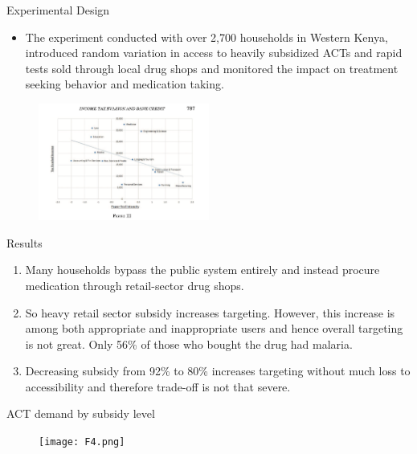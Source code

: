 \documentclass{beamer}
\begin{document}
\begin{frame}{Experimental Design}
\begin{itemize}

    \item The experiment  conducted with over 2,700 households in Western Kenya, introduced random variation in
    access to heavily subsidized ACTs and rapid tests sold through local drug shops and monitored the impact on treatment seeking behavior and medication taking.
    


\end{itemize}
\begin{figure}

\includegraphics[width=0.5\textwidth]{F2.png}
\end{figure}
    \end{frame}

\begin{frame}[allowframebreaks]{Results}  
\begin{enumerate}
\item Many households bypass the public system
entirely and instead procure medication through retail-sector drug shops.
\item So heavy retail sector subsidy increases targeting. However, this increase is among both appropriate and inappropriate users and hence overall targeting is not great. Only 56\% of those who bought the drug had malaria.
\item Decreasing subsidy from 92\% to 80\% increases targeting without much loss to accessibility and therefore trade-off is not that severe.

    \end{enumerate}
\end{frame}

\begin{frame}{ACT demand by subsidy level}
\begin{figure}
    \texttt{[image: F4.png]}
\end{figure}
    \end{frame}
\end{document}
